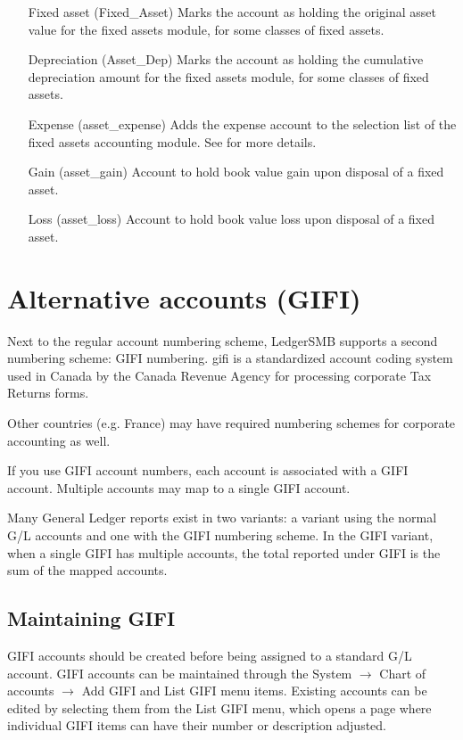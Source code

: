 \begin{enumerate}
\item[Fixed asset (Fixed\_Asset)] Marks the account as holding the original asset value for the fixed
   assets module, for some classes of fixed assets.
\item[Depreciation (Asset\_Dep)] Marks the account as holding the cumulative depreciation amount
   for the fixed assets module, for some classes of fixed assets.
\item[Expense (asset\_expense)] Adds the expense account to the selection list of the fixed assets
   accounting module. See  for more details.
\item[Gain (asset\_gain)] Account to hold book value gain upon disposal of a fixed asset.
\item[Loss (asset\_loss)] Account to hold book value loss upon disposal of a fixed asset.
\end{enumerate}


\section{Alternative accounts (GIFI)}
\label{sec-coa-gifi}

Next to the regular account numbering scheme, LedgerSMB supports a second
numbering scheme: GIFI numbering. \gls{gifi} is a standardized account 
coding system used in Canada by the Canada Revenue Agency for processing
corporate Tax Returns forms. 

Other countries (e.g. France) may have required numbering schemes for
corporate accounting as well.

If you use GIFI account numbers, each account is associated with a GIFI
account. Multiple accounts may map to a single GIFI account.

Many General Ledger reports exist in two variants: a variant using the
normal G/L accounts and one with the GIFI numbering scheme. In the GIFI
variant, when a single GIFI has multiple accounts, the total reported
under GIFI is the sum of the mapped accounts.


\subsection{Maintaining GIFI}
\label{subsec-coa-gifi-maintenance}

GIFI accounts should be created before being assigned to a standard G/L account. GIFI accounts
can be maintained through the System $\rightarrow$ Chart of accounts $\rightarrow$ Add GIFI and List GIFI menu items. Existing accounts can be edited by selecting them from the List GIFI menu, which opens a page where individual GIFI items can have their number or
description adjusted.


